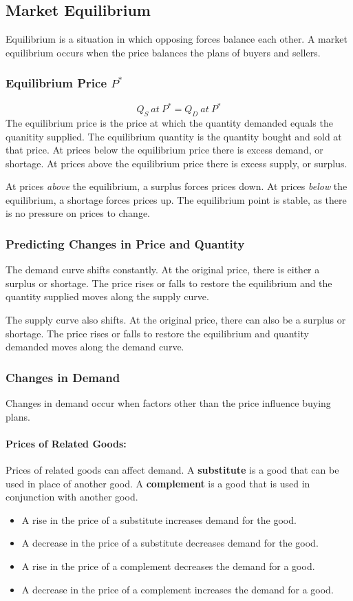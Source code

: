 \documentclass{article}
\begin{document}
\subsection{Market Equilibrium}
Equilibrium is a situation in which opposing forces balance each other. A
market equilibrium occurs when the price balances the plans of buyers and
sellers.

\subsubsection{Equilibrium Price \( P^{*} \)}
\[ Q_{S}\ at\ P^{*} = Q_{D}\ at\ P^{*} \]
The equilibrium price is the price at which the quantity demanded equals the
quanitity supplied. The equilibrium quantity is the quantity bought and sold
at that price. At prices below the equilibrium price there is excess demand,
or shortage. At prices above the equilibrium price there is excess supply,
or surplus. \par
At prices \textit{above} the equilibrium, a surplus forces prices down. At
prices \textit{below} the equilibrium, a shortage forces prices up. The
equilibrium point is stable, as there is no pressure on prices to change.

\subsubsection{Predicting Changes in Price and Quantity}
The demand curve shifts constantly. At the original price, there is either
a surplus or shortage. The price rises or falls to restore the equilibrium
and the quantity supplied moves along the supply curve. \par
The supply curve also shifts. At the original price, there can also be a
surplus or shortage. The price rises or falls to restore the equilibrium and
quantity demanded moves along the demand curve.

\subsubsection{Changes in Demand}
Changes in demand occur when factors other than the price influence buying
plans.

\paragraph{Prices of Related Goods:}
Prices of related goods can affect demand. A \textbf{substitute} is a good
that can be used in place of another good. A \textbf{complement} is a good
that is used in conjunction with another good.
\begin{itemize}
  \item A rise in the price of a substitute increases demand for the good.
  \item A decrease in the price of a substitute decreases demand for the good.
  \item A rise in the price of a complement decreases the demand for a good.
  \item A decrease in the price of a complement increases the demand for a good.
\end{itemize}
\end{document}
